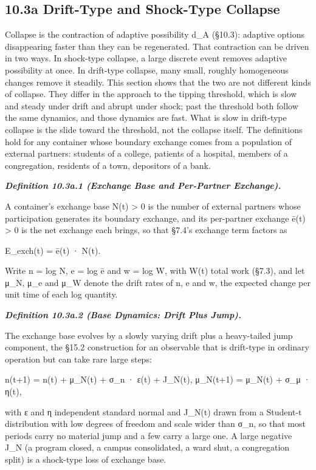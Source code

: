 \documentclass[
]{article}
\begin{document}
\hypertarget{a-drift-type-and-shock-type-collapse}{%
\subsection{10.3a Drift-Type and Shock-Type
Collapse}\label{a-drift-type-and-shock-type-collapse}}

Collapse is the contraction of adaptive possibility d\_A (§10.3):
adaptive options disappearing faster than they can be regenerated. That
contraction can be driven in two ways. In shock-type collapse, a large
discrete event removes adaptive possibility at once. In drift-type
collapse, many small, roughly homogeneous changes remove it steadily.
This section shows that the two are not different kinds of collapse.
They differ in the approach to the tipping threshold, which is slow and
steady under drift and abrupt under shock; past the threshold both
follow the same dynamics, and those dynamics are fast. What is slow in
drift-type collapse is the slide toward the threshold, not the collapse
itself. The definitions hold for any container whose boundary exchange
comes from a population of external partners: students of a college,
patients of a hospital, members of a congregation, residents of a town,
depositors of a bank.

\emph{\textbf{Definition 10.3a.1 (Exchange Base and Per-Partner
Exchange).}}

A container's exchange base N(t) \textgreater{} 0 is the number of
external partners whose participation generates its boundary exchange,
and its per-partner exchange ē(t) \textgreater{} 0 is the net exchange
each brings, so that §7.4's exchange term factors as

E\_exch(t) = ē(t) · N(t).

Write n = log N, e = log ē and w = log W, with W(t) total work (§7.3),
and let μ\_N, μ\_e and μ\_W denote the drift rates of n, e and w, the
expected change per unit time of each log quantity.

\emph{\textbf{Definition 10.3a.2 (Base Dynamics: Drift Plus Jump).}}

The exchange base evolves by a slowly varying drift plus a heavy-tailed
jump component, the §15.2 construction for an observable that is
drift-type in ordinary operation but can take rare large steps:

n(t+1) = n(t) + μ\_N(t) + σ\_n · ε(t) + J\_N(t), μ\_N(t+1) = μ\_N(t) +
σ\_μ · η(t),

with ε and η independent standard normal and J\_N(t) drawn from a
Student-t distribution with low degrees of freedom and scale wider than
σ\_n, so that most periods carry no material jump and a few carry a
large one. A large negative J\_N (a program closed, a campus
consolidated, a ward shut, a congregation split) is a shock-type loss of
exchange base.
\end{document}
